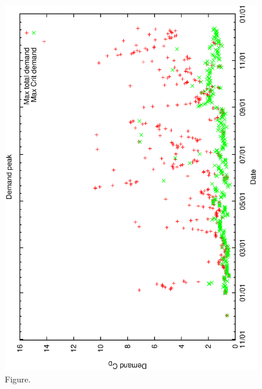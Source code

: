 \documentclass[12pt,a4paper]{article}
\begin{document}
\begin{figure}[htbp]
 \begin{center}
  \includegraphics[scale=1.0, angle=0]{figures/cdmax.eps}
 \end{center}
  \caption[Figure.]
{Figure.}
\end{figure}
\clearpage
\end{document}
